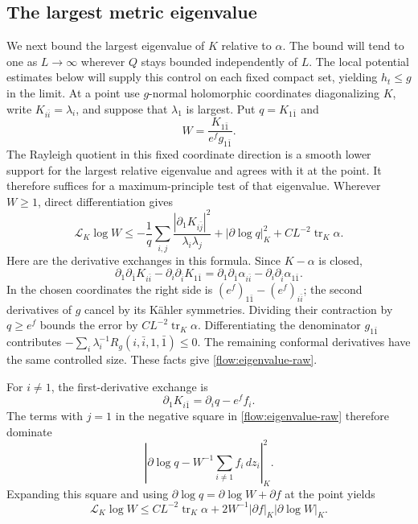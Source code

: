 \documentclass[11pt]{article}
\theoremstyle{definition}
\theoremstyle{remark}
\DeclareMathOperator{\tr}{tr}
\numberwithin{equation}{section}
\begin{document}
\subsection{The largest metric eigenvalue}

We next bound the largest eigenvalue of $K$ relative to $\alpha$.
The bound will tend to one as $L\to\infty$ wherever $Q$ stays bounded
independently of $L$.  The local potential estimates below will supply
this control on each fixed compact set, yielding $h_t\le g$ in the
limit.  At a point use $g$-normal holomorphic
coordinates diagonalizing $K$, write $K_{i\bar i}=\lambda_i$, and
suppose that $\lambda_1$ is largest.  Put $q=K_{1\bar1}$ and
\[
 W=\frac{K_{1\bar1}}{e^fg_{1\bar1}}.
\]
The Rayleigh quotient in this fixed coordinate direction is a smooth
lower support for the largest relative eigenvalue and agrees with it
at the point.  It therefore suffices for a maximum-principle test of
that eigenvalue.  Wherever $W\ge1$, direct differentiation gives
\begin{equation}\label{flow:eigenvalue-raw}
 \mathscr L_K\log W
 \le -\frac1q\sum_{i,j}
            \frac{|\partial_1K_{i\bar j}|^2}{\lambda_i\lambda_j}
       +|\partial\log q|_K^2
       +CL^{-2}\tr_K\alpha.
\end{equation}
Here are the derivative exchanges in this formula.  Since $K-\alpha$
is closed,
\[
 \partial_1\partial_{\bar1}K_{i\bar i}
 -\partial_i\partial_{\bar i}K_{1\bar1}
 =\partial_1\partial_{\bar1}\alpha_{i\bar i}
 -\partial_i\partial_{\bar i}\alpha_{1\bar1}.
\]
In the chosen coordinates the right side is
$(e^f)_{1\bar1}-(e^f)_{i\bar i}$; the second derivatives of $g$
cancel by its K\"ahler symmetries.  Dividing their contraction by
$q\ge e^f$ bounds the error by $CL^{-2}\tr_K\alpha$.
Differentiating the denominator $g_{1\bar1}$ contributes
$-\sum_i\lambda_i^{-1}R_g(i,\bar i,1,\bar1)\le0$.
The remaining conformal derivatives have the same controlled size.
These facts give \eqref{flow:eigenvalue-raw}.

For $i\ne1$, the first-derivative exchange is
\[
 \partial_1K_{i\bar1}=\partial_iq-e^ff_i.
\]
The terms with $j=1$ in the negative square in
\eqref{flow:eigenvalue-raw} therefore dominate
\[
 \left|\partial\log q-W^{-1}\sum_{i\ne1}f_i\,dz_i\right|_K^2.
\]
Expanding this square and using
$\partial\log q=\partial\log W+\partial f$ at the point yields
\begin{equation}\label{flow:eigenvalue-gradient}
 \mathscr L_K\log W
 \le CL^{-2}\tr_K\alpha
       +2W^{-1}|\partial f|_K|\partial\log W|_K.
\end{equation}
\end{document}
